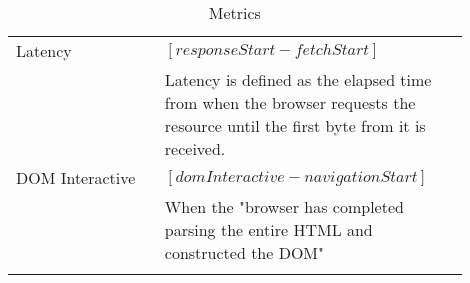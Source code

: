 \begin{center}
\begin{longtable}{ | p{0.3\linewidth} | p{0.6\linewidth} | }
	\hline
	Latency
	& $[responseStart - fetchStart]$ \\ 
	& Latency is defined as the elapsed time from when the browser requests the resource until the first byte from it is received.  \\ %

	\hline
	DOM Interactive
	& $[domInteractive - navigationStart]$ \\
	& When the "browser has completed parsing the entire HTML and constructed the DOM" \\ %

	


	\hline
	\caption{Metrics} %
	\label{table:navigation_timing_metrics}
	\end{longtable}
\end{center}





